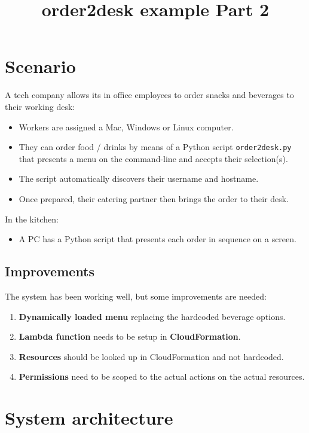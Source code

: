 \documentclass[slides]{pgnotes}
\title{order2desk example Part 2}
\begin{document}
\maketitle

\section{Scenario}

A tech company allows its in office employees to order snacks and beverages to their working desk:
\begin{itemize}
\item Workers are assigned a Mac, Windows or Linux computer.
\item They can order food / drinks by means of a Python script \texttt{order2desk.py} that presents a menu on the command-line and accepts their selection(s).
\item The script automatically discovers their username and hostname.
\item Once prepared, their catering partner then brings the order to their desk.
\end{itemize}
In the kitchen:
\begin{itemize}
\item A PC has a Python script that presents each order in sequence on a screen.
\end{itemize}

\subsection{Improvements}

The system has been working well, but some improvements are needed:

\begin{enumerate}
\item \textbf{Dynamically loaded menu} replacing the hardcoded beverage options.
\item \textbf{Lambda function} needs to be setup in \textbf{CloudFormation}.
\item \textbf{Resources} should be looked up in CloudFormation and not hardcoded.
\item \textbf{Permissions} need to be scoped to the actual actions on the actual resources.  
\end{enumerate}
  
\section{System architecture}
\end{document}

